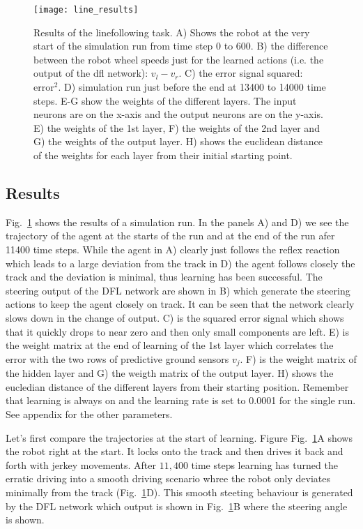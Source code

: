 \documentclass{llncs}
\begin{document}
\begin{figure}[h!]
  \centering
  \texttt{[image: line\_results]}
  \caption{Results of the linefollowing task. A) Shows the robot at
    the very start of the simulation run from time step 0 to 600.
    B) the difference between the robot wheel speeds just for the learned
    actions (i.e. the output of the dfl network): $v_l-v_r$.
    C) the error signal squared: $\mathrm{error}^2$.
    D) simulation run just before the end at 13400 to 14000 time steps.
    E-G show the weights of the different layers. The input neurons are on the x-axis
    and the output neurons are on the y-axis.
    E) the weights of the 1st layer, F) the weights of the 2nd layer and
    G) the weights of the output layer.
        H) shows the euclidean distance of the weights for each layer from their initial starting point.
    \label{line_results}}
\end{figure}



\subsection{Results}
Fig.~\ref{line_results} shows the results of a simulation run. In the panels
A) and D) we see the trajectory of the agent at the starts of the run and
at the end of the run afer 11400 time steps. While the agent in A) clearly
just follows the reflex reaction which leads to a large deviation from the track
in D) the agent follows closely the track and the deviation is minimal, thus
learning has been successful. The steering output of the DFL network are shown
in B) which generate the steering actions to keep the agent closely on track.
It can be seen that the network clearly slows down in the change of output.
C) is the squared error signal which shows that it quickly drops to near zero
and then only small components are left. E) is the weight matrix at the end
of learning of the 1st layer which correlates the error with the two rows of
predictive ground sensors $v_j$. F) is the weight matrix of the hidden layer and G)
the weigth matrix of the output layer. H) shows the eucledian distance of the
different layers from their starting position. Remember that learning is
always on and the learning rate is set to 0.0001 for the single run. See appendix
for the other parameters.

Let's first compare the trajectories at the start of learning. Figure
Fig.~\ref{line_results}A shows the robot right at the start. It locks
onto the track and then drives it back and forth with jerkey
movements. After $11,400$ time steps learning has turned the erratic
driving into a smooth driving scenario whree the robot only deviates
minimally from the track (Fig.~\ref{line_results}D). This smooth
steeting behaviour is generated by the DFL network which output is
shown in Fig.~\ref{line_results}B where the steering angle is shown.
\end{document}
